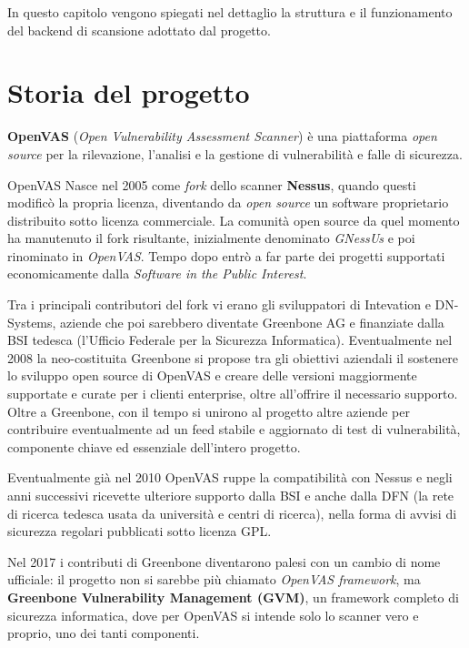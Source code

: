 In questo capitolo vengono spiegati nel dettaglio la struttura e il funzionamento del backend di scansione adottato dal progetto.

\section{Storia del progetto}
\textbf{OpenVAS} (\emph{Open Vulnerability Assessment Scanner}) è una piattaforma \emph{open source} per la rilevazione, l'analisi e la gestione di vulnerabilità e falle di sicurezza.

OpenVAS Nasce nel 2005 come \emph{fork} dello scanner \textbf{Nessus}, quando questi modificò la propria licenza, diventando da \emph{open source} un software proprietario distribuito sotto licenza commerciale. La comunità open source da quel momento ha manutenuto il fork risultante, inizialmente denominato \emph{GNessUs} e poi rinominato in \emph{OpenVAS}. Tempo dopo entrò a far parte dei progetti supportati economicamente dalla \emph{Software in the Public Interest}.

Tra i principali contributori del fork vi erano gli sviluppatori di Intevation e DN-Systems, aziende che poi sarebbero diventate Greenbone AG e finanziate dalla BSI tedesca (l'Ufficio Federale per la Sicurezza Informatica). Eventualmente nel 2008 la neo-costituita Greenbone si propose tra gli obiettivi aziendali il sostenere lo sviluppo open source di OpenVAS e creare delle versioni maggiormente supportate e curate per i clienti enterprise, oltre all'offrire il necessario supporto. Oltre a Greenbone, con il tempo si unirono al progetto altre aziende per contribuire eventualmente ad un feed stabile e aggiornato di test di vulnerabilità, componente chiave ed essenziale dell'intero progetto.

Eventualmente già nel 2010 OpenVAS ruppe la compatibilità con Nessus e negli anni successivi ricevette ulteriore supporto dalla BSI e anche dalla DFN (la rete di ricerca tedesca usata da università e centri di ricerca), nella forma di avvisi di sicurezza regolari pubblicati sotto licenza GPL.

Nel 2017 i contributi di Greenbone diventarono palesi con un cambio di nome ufficiale: il progetto non si sarebbe più chiamato \emph{OpenVAS framework}, ma \textbf{Greenbone Vulnerability Management (GVM)}, un framework completo di sicurezza informatica, dove per OpenVAS si intende solo lo scanner vero e proprio, uno dei tanti componenti.

